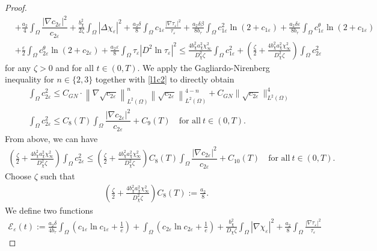 \documentclass[a4paper,10pt]{article}
\theoremstyle{definition}
\begin{document}
\begin{proof}
\begin{align}
    \nonumber &  + \frac{a_2}{4}  \int_\Omega \dfrac{|\nabla c_{2 \varepsilon}|^2}{c_{2\varepsilon}} + \frac{b_\chi^2}{2 \zeta} \int_\Omega |\Delta \chi_\varepsilon|^2 + \frac{a_2 \delta}{8} \int_\Omega c_{1\varepsilon} \frac{|\nabla \tau_\varepsilon|^2}{\tau_\varepsilon} + \frac{a_2 \delta \beta}{8 b_\tau} \int_\Omega c_{1\varepsilon}^2 \ln(2 + c_{1\varepsilon}) + \frac{a_2 \delta \varepsilon}{8 b_\tau} \int_\Omega c_{1\varepsilon}^\theta \ln(2 + c_{1\varepsilon})  \\[5pt]
    & + \frac{\varepsilon}{2} \int_\Omega c_{2\varepsilon}^\theta \ln(2 + c_{2\varepsilon}) +\frac{a_2 \varepsilon}{8} \int_\Omega \tau_\varepsilon |D^2 \ln \tau_\varepsilon|^2  \leq \frac{4b_\chi^2 a_\chi^2 \chi_\infty^2}{D_\chi^2 \zeta} \int_\Omega c_{1\varepsilon}^2 + \left(\tfrac{\zeta}{2} +  \tfrac{4b_\chi^2 a_\chi^2 \chi_\infty^2}{D_\chi^2 \zeta}\right) \int_\Omega c_{2\varepsilon}^2
\end{align}
for any $\zeta > 0$ and for all $t \in (0, T)$. We apply the Gagliardo-Nirenberg inequality  \cite[(3.19) with $q = 2$]{tao2021global} for $n \in \{2, 3\}$ together with \eqref{l1c2} to directly obtain
 \begin{align}
 \label{c2_sq1}
    \nonumber & \int_\Omega c_{2\varepsilon}^2 \leq C_{GN}\cdot \left\|\nabla \sqrt{c_{2\varepsilon}}\right\|^n_{L^2(\Omega)}\left\|\sqrt{c_{2\varepsilon}}\right\|^{4 -
    n}_{L^2(\Omega)} + C_{GN} \|\sqrt{c_{2\varepsilon}}\|^4_{L^2(\Omega)}\\[5pt]
    & \int_\Omega c_{2\varepsilon}^2 \leq C_8(T) \int_\Omega \dfrac{|\nabla c_{2\varepsilon}|^2}{c_{2\varepsilon}} + C_9(T)  \quad \text{for all} ~  t \in (0, T).
  \end{align}
From above, we can have
\begin{align}
    \label{c234}
    \left(\tfrac{\zeta}{2} +  \tfrac{4b_\chi^2 a_\chi^2 \chi_\infty^2}{D_\chi^2 \zeta}\right) \int_\Omega c_{2\varepsilon}^2 \leq  \left(\tfrac{\zeta}{2} +  \tfrac{4b_\chi^2 a_\chi^2 \chi_\infty^2}{D_\chi^2 \zeta}\right)C_8(T) \int_\Omega \dfrac{|\nabla c_{2\varepsilon}|^2}{c_{2\varepsilon}} + C_{10}(T)  \quad \text{for all} ~  t \in (0, T).
\end{align}
Choose $\zeta$ such that
\begin{align}
    \label{c235}
    \left(\tfrac{\zeta}{2} +  \tfrac{4b_\chi^2 a_\chi^2 \chi_\infty^2}{D_\chi^2 \zeta}\right)C_8(T) := \frac{a_2}{8}.
\end{align}
We define two functions
\begin{align}
    \label{entro23}
    \mathcal{E}_\varepsilon(t) := \frac{a_2 \delta}{4 b_\tau} \int_\Omega \left(c_{1\varepsilon} \ln c_{1\varepsilon} + \tfrac{1}{e}\right) + \int_\Omega \left(c_{2 \varepsilon} \ln c_{2 \varepsilon} + \tfrac{1}{e}\right) + \frac{b_\chi^2}{D_\chi \zeta} \int_\Omega |\nabla \chi_\varepsilon|^2 + \frac{a_2}{8} \int_\Omega \frac{|\nabla \tau_\varepsilon|^2}{\tau_\varepsilon}

\end{align}
\end{proof}
\end{document}
